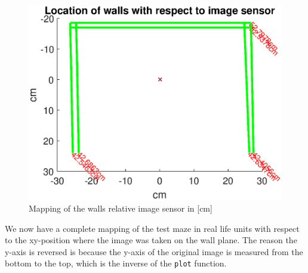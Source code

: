 \begin{figure}[H]
\centering
\includegraphics[width=\textwidth]{fig/mapping}
  \caption{Mapping of the walls relative image sensor in [cm]}
  \label{fig:mapping}
\end{figure}
We now have a complete mapping of the test maze in real life units with respect to the xy-position where the image was taken on the wall plane. The reason the y-axis is reversed is because the y-axis of the original image is measured from the bottom to the top, which is the inverse of the \texttt{plot} function. 



















